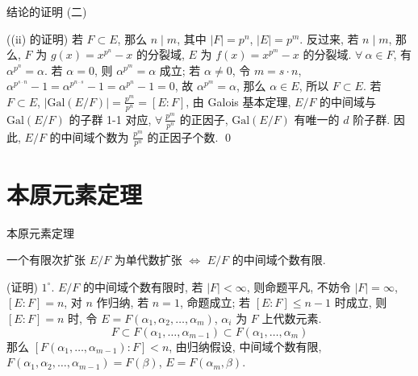 \begin{frame}{结论的证明 (二)}

\startproof[bg=yellow, fg=red]((ii) 的证明)
若 $F \subset E$, 那么 $n \mid m$, 其中 $|F| = p^n$, $|E| = p^m$.
反过来, 若 $n \mid m$, 那么,
$F$ 为 $g(x) = x^{p^n} - x$ 的分裂域,
$E$ 为 $f(x) = x^{p^m} - x$ 的分裂域.
$\forall\ \alpha \in F$, 有 $\alpha^{p^n} = \alpha$. 若 $\alpha = 0$,
则 $\alpha^{p^m} = \alpha$ 成立;
若 $\alpha \neq 0$, 令 $m = s \cdot n$,
$\alpha^{p^{s \cdot n}} - 1 = \alpha^{p^{n \cdot s}} - 1 = \alpha^{p^n} - 1 = 0$,
故 $\alpha^{p^m} = \alpha$, 那么 $\alpha \in E$, 所以 $F \subset E$.
若 $F \subset E$, $|\mathrm{Gal}(E/F)| = \frac{p^m}{p^n} = [E:F]$,
由 Galois 基本定理, $E/F$ 的中间域与 $\mathrm{Gal}(E/F)$ 的子群 1-1 对应,
$\forall\ \frac{p^m}{p^n}$ 的正因子, $\mathrm{Gal}(E/F)$ 有唯一的 $d$ 阶子群.
因此, $E/F$ 的中间域个数为 $\frac{p^m}{p^n}$ 的正因子个数.
\qed

\end{frame}


\section[本原元素]{本原元素定理}


\begin{frame}{本原元素定理}

\begin{thm}[本原元素定理]
一个有限次扩张 $E/F$ 为单代数扩张 $\iff$ $E/F$ 的中间域个数有限.
\end{thm}

\startproof[bg=yellow, fg=red](证明)
$1^{\circ}$. $E/F$ 的中间域个数有限时,
若 $|F| < \infty$, 则命题平凡, 不妨令 $|F| = \infty$, $[E:F] = n$,
对 $n$ 作归纳, 若 $n = 1$, 命题成立;
若 $[E:F] \leq n - 1$ 时成立, 则 $[E:F] = n$ 时,
令 $E = F(\alpha_1, \alpha_2, \dots, \alpha_m)$, $\alpha_i$ 为 $F$ 上代数元素.
\[
F \subset F(\alpha_1, \dots, \alpha_{m-1}) \subset F(\alpha_1, \dots, \alpha_m)
\]
那么 $[F(\alpha_1, \dots, \alpha_{m-1}):F] < n$, 由归纳假设,
中间域个数有限, $F(\alpha_1, \alpha_2, \dots, \alpha_{m-1}) = F(\beta)$,
$E = F(\alpha_m, \beta)$.

\end{frame}


